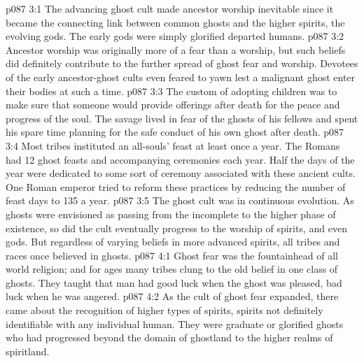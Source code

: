 \vs p087 3:1 The advancing ghost cult made ancestor worship inevitable since it became the connecting link between common ghosts and the higher spirits, the evolving gods. The early gods were simply glorified departed humans.
\vs p087 3:2 Ancestor worship was originally more of a fear than a worship, but such beliefs did definitely contribute to the further spread of ghost fear and worship. Devotees of the early ancestor\hyp{}ghost cults even feared to yawn lest a malignant ghost enter their bodies at such a time.
\vs p087 3:3 The custom of adopting children was to make sure that someone would provide offerings after death for the peace and progress of the soul. The savage lived in fear of the ghosts of his fellows and spent his spare time planning for the safe conduct of his own ghost after death.
\vs p087 3:4 Most tribes instituted an all\hyp{}souls’ feast at least once a year. The Romans had 12 ghost feasts and accompanying ceremonies each year. Half the days of the year were dedicated to some sort of ceremony associated with these ancient cults. One Roman emperor tried to reform these practices by reducing the number of feast days to 135 a year.
\vs p087 3:5 \pc The ghost cult was in continuous evolution. As ghosts were envisioned as passing from the incomplete to the higher phase of existence, so did the cult eventually progress to the worship of spirits, and even gods. But regardless of varying beliefs in more advanced spirits, all tribes and races once believed in ghosts.
\vs p087 4:1 Ghost fear was the fountainhead of all world religion; and for ages many tribes clung to the old belief in one class of ghosts. They taught that man had good luck when the ghost was pleased, bad luck when he was angered.
\vs p087 4:2 As the cult of ghost fear expanded, there came about the recognition of higher types of spirits, spirits not definitely identifiable with any individual human. They were graduate or glorified ghosts who had progressed beyond the domain of ghostland to the higher realms of spiritland.
